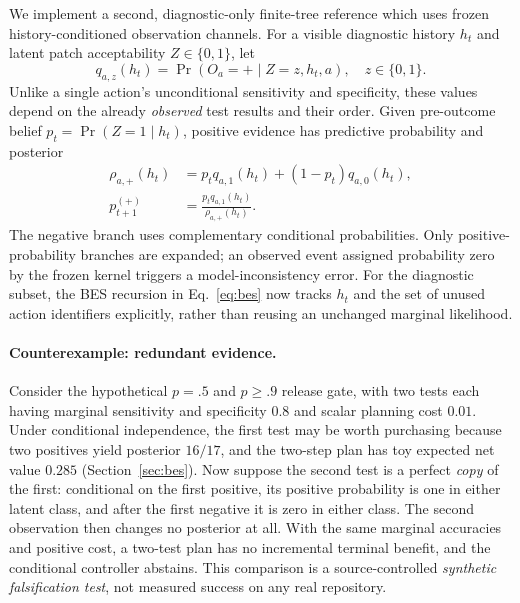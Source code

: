 \documentclass[pdflatex,sn-basic]{sn-jnl}
\begin{document}
We implement a second, diagnostic-only finite-tree reference
which uses frozen history-conditioned observation channels.
For a visible diagnostic history $h_t$ and latent patch
acceptability $Z\in\{0,1\}$, let
\begin{equation}
q_{a,z}(h_t)=
  \Pr(O_a=+\mid Z=z,h_t,a),\quad z\in\{0,1\}.
\label{eq:conditional-likelihood}
\end{equation}
Unlike a single action's unconditional sensitivity and
specificity, these values depend on the already \emph{observed}
test results and their order. Given pre-outcome belief
$p_t=\Pr(Z=1\mid h_t)$, positive evidence has predictive
probability and posterior
\begin{align}
\rho_{a,+}(h_t)
 &=p_tq_{a,1}(h_t)+(1-p_t)q_{a,0}(h_t),\\
p_{t+1}^{(+)}
 &=\frac{p_tq_{a,1}(h_t)}{\rho_{a,+}(h_t)}.
\label{eq:conditional-bayes}
\end{align}
The negative branch uses complementary conditional
probabilities. Only positive-probability branches are
expanded; an observed event assigned probability zero by
the frozen kernel triggers a model-inconsistency error.
For the diagnostic subset, the BES recursion in
Eq.~\eqref{eq:bes} now tracks $h_t$ and the set of
unused action identifiers explicitly, rather than
reusing an unchanged marginal likelihood.

\paragraph{Counterexample: redundant evidence.}
Consider the hypothetical $p=.5$ and $p\ge.9$ release
gate, with two tests each having marginal sensitivity
and specificity $0.8$ and scalar planning cost $0.01$.
Under conditional independence, the first test may be
worth purchasing because two positives yield posterior
$16/17$, and the two-step plan has toy expected net
value $0.285$ (Section~\ref{sec:bes}).
Now suppose the second test is a perfect \emph{copy}
of the first: conditional on the first positive,
its positive probability is one in either latent class,
and after the first negative it is zero in either class.
The second observation then changes no posterior at all.
With the same marginal accuracies and positive cost,
a two-test plan has no incremental terminal benefit,
and the conditional controller abstains. This comparison
is a source-controlled \emph{synthetic falsification test},
not measured success on any real repository.
\end{document}

